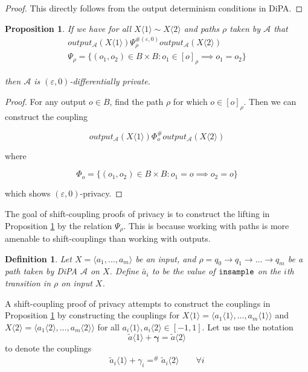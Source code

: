 \documentclass{article}
\newtheorem{proposition}{Proposition}[section]
\newtheorem{definition}{Definition}[section]
\renewcommand{\epsilon}{\varepsilon}
\newcommand{\insample}{\textup{\texttt{insample}}}
\newcommand{\1}{\langle 1 \rangle}
\newcommand{\2}{\langle 2 \rangle}
\begin{document}
\begin{proof}
    This directly follows from the output determinism conditions in DiPA. 
\end{proof}


\begin{proposition}
    \label{prop:output_coupling}
    If we have for all $X \1 \sim X \2$ and paths $\rho$ taken by $\mathcal{A}$ that 
    \begin{align*}
        output_{\mathcal{A}}(X \1) \Psi_{\rho}^{\#(\epsilon, 0)} output_{\mathcal{A}}(X \2) \\[1em]
        \Psi_{\rho} = \{(o_1, o_2) \in B \times B : o_1 \in [o]_\rho \implies o_1 = o_2\}
    \end{align*}

    then $\mathcal{A}$ is $(\epsilon, 0)$-differentially private.
\end{proposition}

\begin{proof}
    For any output $o \in B$, find the path $\rho$ for which $o \in [o]_\rho$. Then we can construct the coupling

    \[output_{\mathcal{A}}(X \1) \Phi_o^{\#} output_{\mathcal{A}}(X \2)\]

    where 

    \[\Phi_o = \{(o_1, o_2) \in B \times B : o_1 = o \implies o_2 = o\}\]

    which shows $(\epsilon, 0)$-privacy. 
\end{proof}

The goal of shift-coupling proofs of privacy is to construct the lifting in Proposition \ref{prop:output_coupling} by the relation $\Psi_\rho$. This is because working with paths is more amenable to shift-couplings than working with outputs.

\begin{definition}
    Let  $X = \langle a_1, \dots, a_m \rangle$ be an input, and $\rho = q_0 \to q_1 \to \dots \to q_m$ be a path taken by DiPA $\mathcal{A}$ on $X$. Define $\tilde{a_i}$ to be the value of $\insample$ on the $i$th transition in $\rho$ on input $X$.
\end{definition}

A shift-coupling proof of privacy attempts to construct the couplings in Proposition \ref{prop:output_coupling}  by constructing the couplings for $X \1 = \langle a_1 \1, \dots, a_m \1 \rangle$ and $X \2 = \langle a_1 \2, \dots, a_m \2 \rangle$ for all $a_i \1, a_i \2 \in [-1, 1]$. Let us use the notation \[\tilde{a} \1 + \boldsymbol{\gamma} = \tilde{a} \2\] to denote the couplings \begin{align*}
    \tilde{a}_i \1 + \gamma_i =^{\#} \tilde{a}_i \2 \qquad \forall i 
\end{align*}
\end{document}
